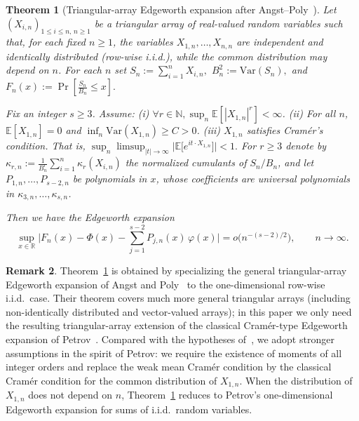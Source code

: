\documentclass{article}
\theoremstyle{plain}
\newtheorem{theorem}{Theorem}[section]
\theoremstyle{definition}
\newtheorem{remark}[theorem]{Remark}
\begin{document}
\begin{theorem}[Triangular-array Edgeworth expansion after Angst--Poly~\cite{angstWeakCramerCondition2017}]
\label{thm:edgeworth-triangular}
Let $(X_{i,n})_{1\le i\le n,\,n\ge1}$ be a triangular array of
real-valued random variables such that, for each fixed $n\ge1$,
the variables $X_{1,n},\dots,X_{n,n}$ are independent and identically
distributed (row-wise i.i.d.), while the common distribution may depend
on $n$. For each $n$ set
$
  S_n := \sum_{i=1}^n X_{i,n},
$
$
  B_n^2 := \mathrm{Var}(S_n),
$ and 
$
  F_n(x) := \Pr\left[\frac{S_n}{B_n}\le x\right].
$

Fix an integer $s\ge 3$. Assume:
  (i)  $\forall r\in \mathbb{N}, \sup_n \mathbb{E}[|X_{1,n}|^r]<\infty$.
  (ii) For all $n$, $\mathbb{E}[X_{1,n}]=0$ and $\inf_n \mathrm{Var}(X_{1,n})\geq C>0$.
  (iii) $X_{1,n}$ satisfies Cram\'er's condition. That is,
$
  \sup_n \limsup_{|t|\to\infty} \bigl|\mathbb{E}\big[e^{i t \cdot X_{1,n}}\big]\bigr| < 1.
$
For $r\ge3$ denote by
$
  \kappa_{r,n} := \frac{1}{B_n^r}\sum_{i=1}^n \kappa_r(X_{i,n})
$
the normalized cumulants of $S_n/B_n$, and let $P_{1,n},\dots,P_{s-2,n}$
be polynomials in $x$, whose coefficients are universal polynomials in
$\kappa_{3,n},\dots,\kappa_{s,n}$.

Then we have the Edgeworth expansion
\[
  \sup_{x\in\mathbb{R}}
  \biggl|
    F_n(x) - \Phi(x)
    - \sum_{j=1}^{s-2} P_{j,n}(x)\,\varphi(x)
  \biggr|
  = o\bigl(n^{-(s-2)/2}\bigr),
  \qquad n\to\infty.
\]
\end{theorem}



\begin{remark}
Theorem~\ref{thm:edgeworth-triangular} is obtained by specializing the
general triangular-array Edgeworth expansion of Angst and
Poly~\cite[Thm.~4.3]{angstWeakCramerCondition2017} to the
one-dimensional row-wise i.i.d.\ case. Their theorem covers much more
general triangular arrays (including non-identically distributed and
vector-valued arrays); in this paper we only need the resulting
triangular-array extension of the classical Cramér-type Edgeworth
expansion of Petrov~\cite[Ch.~VI, Thms.~3–4]{petrovSumsIndependentRandom1975}.
Compared with the hypotheses of~\cite[Thm.~4.3]{angstWeakCramerCondition2017},
we adopt stronger assumptions in the spirit of Petrov: we require the
existence of moments of all integer orders and replace the weak mean
Cramér condition by the classical Cramér condition for the
common distribution of $X_{1,n}$. When the distribution of $X_{1,n}$ does not depend on
$n$, Theorem~\ref{thm:edgeworth-triangular} reduces to Petrov's
one-dimensional Edgeworth expansion for sums of i.i.d.\ random
variables.
\end{remark}
\end{document}
